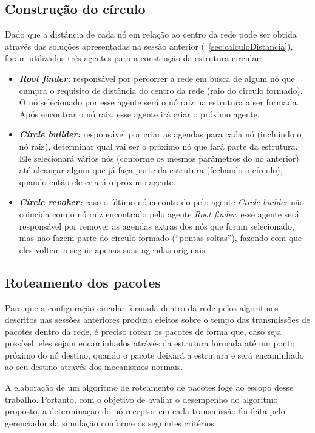 \subsection{Construção do círculo}

Dado que a distância de cada nó em relação ao centro da rede pode ser obtida através das soluções apresentadas na sessão anterior (~\ref{sec:calculoDistancia}), foram utilizados três agentes para a construção da estrutura circular: 

\begin{itemize}
 \item \textbf{\emph{Root finder:}} responsável por percorrer a rede em busca de algum nó que cumpra o requisito de distância do centro da rede (raio do circulo formado). O nó selecionado por esse agente será o nó raiz na estrutura a ser formada. Após encontrar o nó raiz, esse agente irá criar o próximo agente. 
 \item \textbf{\emph{Circle builder:}} responsável por criar as agendas para cada nó (incluindo o nó raiz), determinar qual vai ser o próximo nó que fará parte da estrutura. Ele selecionará vários nós (conforme os mesmos parâmetros do nó anterior) até alcançar algum que já faça parte da estrutura (fechando o círculo), quando então ele criará o próximo agente.
 \item \textbf{\emph{Circle revoker:}} caso o último nó encontrado pelo agente \emph{Circle builder} não coincida com o nó raiz encontrado pelo agente \emph{Root finder}, esse agente será responsável por remover as agendas extras dos nós que foram selecionado, mas não fazem parte do círculo formado (``pontas soltas''), fazendo com que eles voltem a seguir apenas suas agendas originais.
\end{itemize}

\subsection{Roteamento dos pacotes}

Para que a configuração circular formada dentro da rede pelos algoritmos descritos nas sessões anteriores produza efeitos sobre o tempo das transmissões de pacotes dentro da rede, é preciso rotear os pacotes de forma que, caso seja possível, eles sejam encaminhados atrávés da estrutura formada até um ponto próximo do nó destino, quando o pacote deixará a estrutura e será encaminhado ao seu destino através dos mecanismos normais. 

A elaboração de um algoritmo de roteamento de pacotes foge ao escopo desse trabalho. Portanto, com o objetivo de avaliar o desempenho do algoritmo proposto, a determinação do nó receptor em cada transmissão foi feita pelo gerenciador da simulação conforme os seguintes critérios:

